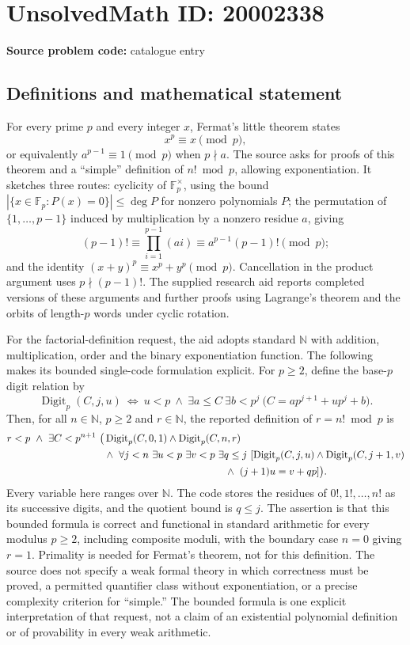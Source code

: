 \documentclass[11pt]{article}
\newcommand{\N}{\mathbb{N}}
\newcommand{\F}{\mathbb{F}}
\begin{document}
\section*{UnsolvedMath ID: 20002338}
\textbf{Source problem code:} catalogue entry
\subsection{Definitions and mathematical statement}
For every prime $p$ and every integer $x$, Fermat's little theorem states
\[
 x^p\equiv x\pmod p,
\]
or equivalently $a^{p-1}\equiv1\pmod p$ when $p\nmid a$. The source asks for proofs of this theorem and a ``simple'' definition of $n!\bmod p$, allowing exponentiation. It sketches three routes: cyclicity of $\F_p^\times$, using the bound $|\{x\in\F_p:P(x)=0\}|\le\deg P$ for nonzero polynomials $P$; the permutation of $\{1,\ldots,p-1\}$ induced by multiplication by a nonzero residue $a$, giving
\[
 (p-1)!\equiv\prod_{i=1}^{p-1}(ai)
 \equiv a^{p-1}(p-1)!\pmod p;
\]
and the identity $(x+y)^p\equiv x^p+y^p\pmod p$. Cancellation in the product argument uses $p\nmid(p-1)!$. The supplied research aid reports completed versions of these arguments and further proofs using Lagrange's theorem and the orbits of length-$p$ words under cyclic rotation.

For the factorial-definition request, the aid adopts standard $\N$ with addition, multiplication, order and the binary exponentiation function. The following makes its bounded single-code formulation explicit. For $p\ge2$, define the base-$p$ digit relation by
\[
 \operatorname{Digit}_p(C,j,u)\ \Longleftrightarrow\
 u<p\ \wedge\ \exists a\le C\ \exists b<p^j\
 \bigl(C=ap^{j+1}+up^j+b\bigr).
\]
Then, for all $n\in\N$, $p\ge2$ and $r\in\N$, the reported definition of $r=n!\bmod p$ is
\[
\begin{split}
 r<p\ \wedge\ \exists C<p^{n+1}\ \bigl(&\operatorname{Digit}_p(C,0,1)
 \wedge\operatorname{Digit}_p(C,n,r)\\
 &\wedge\ \forall j<n\ \exists u<p\ \exists v<p\ \exists q\le j\
 [\operatorname{Digit}_p(C,j,u)\wedge
 \operatorname{Digit}_p(C,j+1,v)\\
 &\hspace{42mm}\wedge\ (j+1)u=v+qp]\bigr).
\end{split}
\]
Every variable here ranges over $\N$. The code stores the residues of $0!,1!,\ldots,n!$ as its successive digits, and the quotient bound is $q\le j$. The assertion is that this bounded formula is correct and functional in standard arithmetic for every modulus $p\ge2$, including composite moduli, with the boundary case $n=0$ giving $r=1$. Primality is needed for Fermat's theorem, not for this definition. The source does not specify a weak formal theory in which correctness must be proved, a permitted quantifier class without exponentiation, or a precise complexity criterion for ``simple.'' The bounded formula is one explicit interpretation of that request, not a claim of an existential polynomial definition or of provability in every weak arithmetic.
\end{document}
